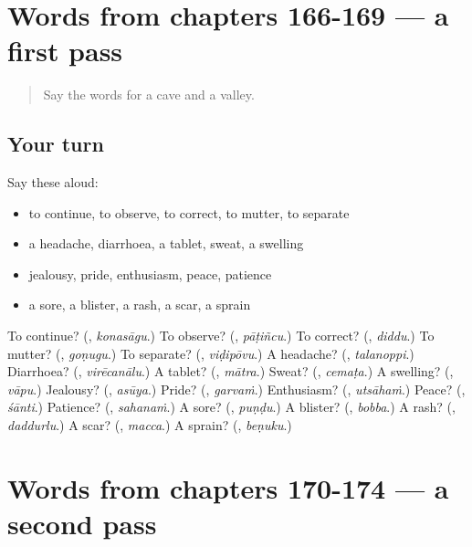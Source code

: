 \section[(dialogue)]{Words from chapters 166-169 — a first pass}

\label{lesson:TE-R174-first-pass-words-from-chapters-166-169}



\begin{quote}
Say the words for a cave and a valley.
\end{quote}

\subsection*{Your turn}
Say these aloud:

\begin{itemize}
\raggedright
  \item to continue, to observe, to correct, to mutter, to separate
  \item a headache, diarrhoea, a tablet, sweat, a swelling
  \item jealousy, pride, enthusiasm, peace, patience
  \item a sore, a blister, a rash, a scar, a sprain
\end{itemize}

\begin{tcolorbox}[breakable,colback=teal!4,colframe=teal!35!black,title={Before you move on}]
To continue? (\textbf{}, \emph{konasāgu}.) To observe? (\textbf{}, \emph{pāṭiñcu}.) To correct? (\textbf{}, \emph{diddu}.) To mutter? (\textbf{}, \emph{goṇugu}.) To separate? (\textbf{}, \emph{viḍipōvu}.) A headache? (\textbf{}, \emph{talanoppi}.) Diarrhoea? (\textbf{}, \emph{virēcanālu}.) A tablet? (\textbf{}, \emph{mātra}.) Sweat? (\textbf{}, \emph{cemaṭa}.) A swelling? (\textbf{}, \emph{vāpu}.) Jealousy? (\textbf{}, \emph{asūya}.) Pride? (\textbf{}, \emph{garvaṁ}.) Enthusiasm? (\textbf{}, \emph{utsāhaṁ}.) Peace? (\textbf{}, \emph{śānti}.) Patience? (\textbf{}, \emph{sahanaṁ}.) A sore? (\textbf{}, \emph{puṇḍu}.) A blister? (\textbf{}, \emph{bobba}.) A rash? (\textbf{}, \emph{daddurlu}.) A scar? (\textbf{}, \emph{macca}.) A sprain? (\textbf{}, \emph{beṇuku}.)
\end{tcolorbox}
\section[(dialogue)]{Words from chapters 170-174 — a second pass}

